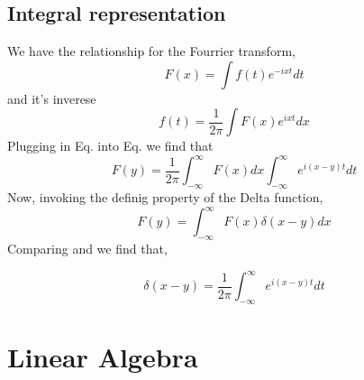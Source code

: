 \subsection{Integral representation}
We have the relationship for the Fourrier transform,
\begin{equation}
F(x) = \int f(t) e^{-ixt} dt
\end{equation}
and it's inverese
\begin{equation}
f(t) = \frac{1}{2 \pi} \int F(x) e^{ixt} dx
\end{equation}
Plugging in Eq. into Eq. we find that 
\begin{equation}
	F(y) = \frac{1}{2 \pi} \int_{-\infty}^{\infty} F(x) dx \int_{-\infty}^{\infty}e^{i(x-y)t} dt
\end{equation}	
Now, invoking the definig property of the Delta function,
\begin{equation}
F(y) = \int_{-\infty}^{\infty} F(x) \delta(x-y) dx
\end{equation}
Comparing and we find that,
\begin{tcolorbox}
\begin{equation}
\delta(x-y) = \frac{1}{2 \pi} \int_{-\infty}^{\infty} e^{i(x-y)t} dt
\end{equation}
\end{tcolorbox}

\section{Linear Algebra}
\label{appendix_a}
